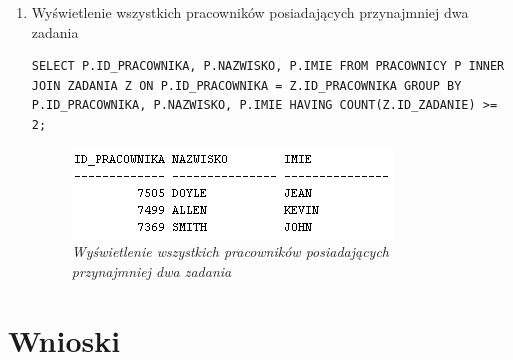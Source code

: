 \documentclass{article}
\begin{document}
\begin{enumerate}
\item Wyświetlenie wszystkich pracowników posiadających przynajmniej dwa zadania

\begin{lstlisting}[style=SQL, caption=\textit{Wyświetlenie wszystkich pracowników posiadających przynajmniej dwa zadania}]
SELECT P.ID_PRACOWNIKA, P.NAZWISKO, P.IMIE FROM PRACOWNICY P INNER JOIN ZADANIA Z ON P.ID_PRACOWNIKA = Z.ID_PRACOWNIKA GROUP BY P.ID_PRACOWNIKA, P.NAZWISKO, P.IMIE HAVING COUNT(Z.ID_ZADANIE) >= 2;
\end{lstlisting}

\begin{figure}[H]
	\centering
	\includegraphics[scale=1.2]{zadanie10.png}
	\caption{\textit{Wyświetlenie wszystkich pracowników posiadających przynajmniej dwa zadania}}
\end{figure}


\end{enumerate}
\section{Wnioski}
\end{document}
